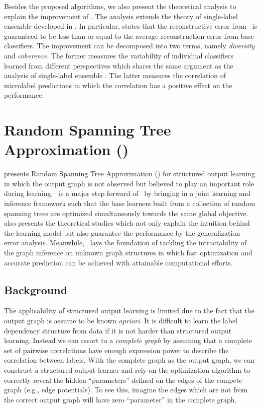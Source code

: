 {Besides the proposed algorithms, we also present the theoretical analysis to explain the improvement of \mam.
The analysis extends the theory of single-label ensemble developed in \citep{Brown10good}.
In particular,  states that the reconstructive error from \mam\ is guaranteed to be less than or equal to the average reconstruction error from base classifiers.
The improvement can be decomposed into two terms, namely \textit{diversity} and \textit{coherence}.
The former measures the variability of individual classifiers learned from different perspectives which shares the same argument as the analysis of single-label ensemble \citep{Brown10good}.
The latter measures the correlation of microlabel predictions in which the correlation has a positive effect on the performance. 


%
%
\section{Random Spanning Tree Approximation (\rta)}\label{sc_su14c}

 presents Random Spanning Tree Approximation (\rta) for structured output learning in which the output graph is not observed but believed to play an important role during learning.
\rta\ is a major step forward of \mam\ by bringing in a joint learning and inference framework such that the base learners built from a collection of random spanning trees are optimized simultaneously towards the same global objective.
 also presents the theoretical studies which not only explain the intuition behind the learning model but also guarantee the performance by the generalization error analysis.
Meanwhile, \rta\ lays the foundation of tackling the intractability of the graph inference on unknown graph structures in which fast optimization and accurate prediction can be achieved with attainable computational efforts.



%
%
\subsection{Background}

The applicability of structured output learning is limited due to the fact that the output graph is assume to be known \textit{apriori}.
It is difficult to learn the label dependency structure from data \citep{Chickering94learning} if it is not harder than structured output learning.
Instead we can resort to a \textit{complete graph} by assuming that a complete set of pairwise correlations have enough expression power to describe the correlation between labels.
With the complete graph as the output graph, we can construct a structured output learner and rely on the optimization algorithm to correctly reveal the hidden ``parameters'' defined on the edges of the compete graph (e.g., edge potentials).
To see this, imagine the edges which are not from the correct output graph will have zero ``parameter'' in the complete graph.

}
